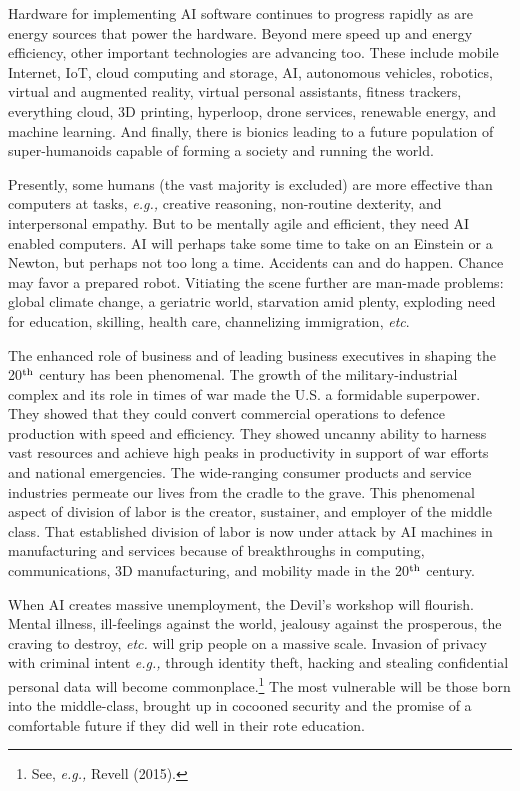 \begin{multicols}{2}
Hardware for implementing AI software continues to progress rapidly as are energy sources that power the hardware. Beyond mere speed up and energy efficiency, other important technologies are advancing too. These include mobile Internet, IoT, cloud computing and storage, AI, autonomous vehicles, robotics, virtual and augmented reality, virtual personal assistants, fitness trackers, everything cloud, 3D printing, hyperloop, drone services, renewable energy, and machine learning. And finally, there is bionics leading to a future population of super-humanoids capable of forming a society and running the world.

Presently, some humans (the vast majority is excluded) are more effective than computers at tasks, \textit{e.g.,} creative reasoning, non-routine dexterity, and interpersonal empathy. But to be mentally agile and efficient, they need AI enabled computers. AI will perhaps take some time to take on an Einstein or a Newton, but perhaps not too long a time. Accidents can and do happen. Chance may favor a prepared robot. Vitiating the scene further are man-made problems: global climate change, a geriatric world, starvation amid plenty, exploding need for education, skilling, health care, channelizing immigration, \textit{etc}. 

The enhanced role of business and of leading business executives in shaping the 20$^{\rm th}$ century has been phenomenal. The growth of the military-industrial complex and its role in times of war made the U.S. a formidable superpower. They showed that they could convert commercial operations to defence production with speed and efficiency. They showed uncanny ability to harness vast resources and achieve high peaks in productivity in support of war efforts and national emergencies. The wide-ranging consumer products and service industries permeate our lives from the cradle to the grave. This phenomenal aspect of division of labor is the creator, sustainer, and employer of the middle class. That established division of labor is now under attack by AI machines in manufacturing and services because of breakthroughs in computing, communications, 3D manufacturing, and mobility made in the 20$^{\rm th}$ century.

When AI creates massive unemployment, the Devil's workshop will flourish. Mental illness, ill-feelings against the world, jealousy against the prosperous, the craving to destroy, \textit{etc.} will grip people on a massive scale. Invasion of privacy with criminal intent \textit{e.g.,} through identity theft, hacking and stealing confidential personal data will become commonplace.\footnote{See, \textit{e.g.,} Revell (2015).}  The most vulnerable will be those born into the middle-class, brought up in cocooned security and the promise of a comfortable future if they did well in their rote education.\\[-20pt]


\end{multicols}

